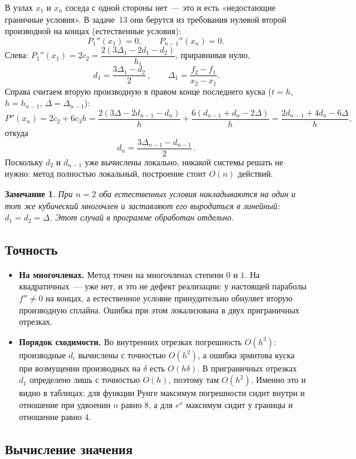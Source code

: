 \documentclass[11pt,a4paper]{report}
\newtheorem{zam}{Замечание}[chapter]
\begin{document}
В узлах $x_1$ и $x_n$ соседа с одной стороны нет~--- это и есть «недостающие
граничные условия». В задаче~13 они берутся из требования нулевой второй
производной на концах (естественные условия):
\[
P_1''(x_1)=0,\qquad P_{n-1}''(x_n)=0 .
\]
Слева: $P_1''(x_1)=2c_2=\dfrac{2(3\Delta_1-2d_1-d_2)}{h_1}$, приравнивая нулю,
\[
\boxed{\,d_1=\frac{3\Delta_1-d_2}{2}\,},\qquad \Delta_1=\frac{f_2-f_1}{x_2-x_1}.
\]
Справа считаем вторую производную в правом конце последнего куска
($t=h$, $h=h_{n-1}$, $\Delta=\Delta_{n-1}$):
\[
P''(x_n)=2c_2+6c_3h
=\frac{2(3\Delta-2d_{n-1}-d_n)}{h}+\frac{6(d_{n-1}+d_n-2\Delta)}{h}
=\frac{2d_{n-1}+4d_n-6\Delta}{h},
\]
откуда
\[
\boxed{\,d_n=\frac{3\Delta_{n-1}-d_{n-1}}{2}\,}.
\]
Поскольку $d_2$ и $d_{n-1}$ уже вычислены локально, никакой системы решать не
нужно: метод полностью локальный, построение стоит $O(n)$ действий.

\begin{zam}
При $n=2$ оба естественных условия накладываются на один и тот же кубический
многочлен и заставляют его выродиться в линейный: $d_1=d_2=\Delta$. Этот случай
в программе обработан отдельно.
\end{zam}

\subsection{Точность}

\begin{itemize}[nosep]
\item \textbf{На многочленах.} Метод точен на многочленах степени $0$ и $1$.
На квадратичных~--- уже нет, и это не дефект реализации: у настоящей параболы
$f''\neq0$ на концах, а естественное условие принудительно обнуляет вторую
производную сплайна. Ошибка при этом локализована в двух приграничных отрезках.
\item \textbf{Порядок сходимости.} Во внутренних отрезках погрешность
$O(h^3)$: производные $d_i$ вычислены с точностью $O(h^2)$, а ошибка эрмитова
куска при возмущении производных на $\delta$ есть $O(h\delta)$. В приграничных
отрезках $d_1$ определено лишь с точностью $O(h)$, поэтому там $O(h^2)$.
Именно это и видно в таблицах: для функции Рунге максимум погрешности сидит
внутри и отношение при удвоении $n$ равно $8$, а для $e^x$ максимум сидит у
границы и отношение равно $4$.
\end{itemize}

\subsection{Вычисление значения}
\end{document}
